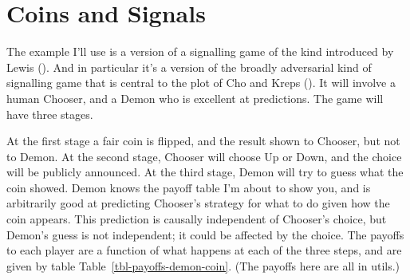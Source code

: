 \documentclass[
  11pt,
  letterpaper,
  DIV=11,
  numbers=noendperiod,
  twoside]{scrartcl}
\begin{document}
\section{Coins and Signals}\label{sec-coinssignals}

The example I'll use is a version of a signalling game of the kind
introduced by Lewis (). And in particular
it's a version of the broadly adversarial kind of signalling game that
is central to the plot of Cho and Kreps
(). It will involve a human Chooser,
and a Demon who is excellent at predictions. The game will have three
stages.

At the first stage a fair coin is flipped, and the result shown to
Chooser, but not to Demon. At the second stage, Chooser will choose Up
or Down, and the choice will be publicly announced. At the third stage,
Demon will try to guess what the coin showed. Demon knows the payoff
table I'm about to show you, and is arbitrarily good at predicting
Chooser's strategy for what to do given how the coin appears. This
prediction is causally independent of Chooser's choice, but Demon's
guess is not independent; it could be affected by the choice. The
payoffs to each player are a function of what happens at each of the
three steps, and are given by table Table~\ref{tbl-payoffs-demon-coin}.
(The payoffs here are all in utils.)
\end{document}
